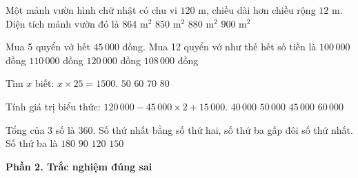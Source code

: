 \begin{ex} %
Một mảnh vườn hình chữ nhật có chu vi $120\text{ m}$, chiều dài hơn chiều rộng $12\text{ m}$. Diện tích mảnh vườn đó là
\choice
{\True $864\text{ m}^2$}
{$850\text{ m}^2$}
{$880\text{ m}^2$}
{$900\text{ m}^2$}
\end{ex}

\begin{ex} %
Mua 5 quyển vở hết $45\,000$ đồng. Mua 12 quyển vở như thế hết số tiền là
\choice
{$100\,000$ đồng}
{$110\,000$ đồng}
{$120\,000$ đồng}
{\True $108\,000$ đồng}
\end{ex}

\begin{ex} %
Tìm $x$ biết: $x \times 25 = 1500$.
\choice
{$50$}
{\True $60$}
{$70$}
{$80$}
\end{ex}

\begin{ex} %
Tính giá trị biểu thức: $120\,000 - 45\,000 \times 2 + 15\,000$.
\choice
{$40\,000$}
{$50\,000$}
{\True $45\,000$}
{$60\,000$}
\end{ex}

\begin{ex} %
Tổng của 3 số là $360$. Số thứ nhất bằng số thứ hai, số thứ ba gấp đôi số thứ nhất. Số thứ ba là
\choice
{\True $180$}
{$90$}
{$120$}
{$150$}
\end{ex}

\textbf{Phần 2. Trắc nghiệm đúng sai}

